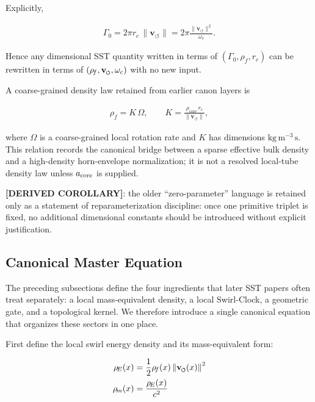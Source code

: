 \documentclass[11pt]{article}
\theoremstyle{definition}
\theoremstyle{plain}
\theoremstyle{remark}
\newcommand{\swirlarrow}{\mathchoice{\mkern-2mu\scriptstyle\boldsymbol{\circlearrowleft}}{\mkern-2mu\scriptstyle\boldsymbol{\circlearrowleft}}{\mkern-2mu\scriptscriptstyle\boldsymbol{\circlearrowleft}}{\mkern-2mu\scriptscriptstyle\boldsymbol{\circlearrowleft}}}
\newcommand{\vswirl}{\mathbf{v}_{\swirlarrow}}
\newcommand{\rhoF}{{\rho_{\!f}}}
\newcommand{\rhoE}{\rho_{\!E}}
\newcommand{\rhoM}{\rho_{\!m}}
\newcommand{\rhocore}{\rho_{\mathrm{core}}}
\newcommand{\rc}{{r_c}}
\newcommand{\vnorm}{\lVert \mathbf{v}_{\!\boldsymbol{\circlearrowleft}} \rVert}
\begin{document}
        Explicitly,

        \begin{align}
            \Gamma_0 = 2\pi \rc \, \vnorm
            = 2\pi \frac{\vnorm^2}{\omega_c}.
            \label{eq:gamma0_reparam}
        \end{align}

        Hence any dimensional SST quantity written in terms of $(\Gamma_0,\rhoF,\rc)$ can be rewritten in terms of $(\rhoF,\vswirl,\omega_c)$ with no new input.

        A coarse-grained density law retained from earlier canon layers is

        \begin{align}
            \rhoF = K\,\Omega,
            \qquad
            K = \frac{\rhocore \, \rc}{\vnorm},
            \label{eq:coarse_grain_density}
        \end{align}

        where $\Omega$ is a coarse-grained local rotation rate and $K$ has dimensions $\mathrm{kg\,m^{-3}\,s}$. This relation records the canonical bridge between a sparse effective bulk density and a high-density horn-envelope normalization; it is not a resolved local-tube density law unless $a_{\rm core}$ is supplied.

        \textbf{[DERIVED COROLLARY]}: the older ``zero-parameter'' language is retained only as a statement of reparameterization discipline: once one primitive triplet is fixed, no additional dimensional constants should be introduced without explicit justification.

    \subsection{Canonical Master Equation}
    \label{sec:master-equation}

        The preceding subsections define the four ingredients that later SST papers often treat separately:
        a local mass-equivalent density, a local Swirl-Clock, a geometric gate, and a topological kernel.
        We therefore introduce a single canonical equation that organizes these sectors in one place.

        First define the local swirl energy density and its mass-equivalent form:

        \begin{align}
            \rhoE(x) &= \frac{1}{2}\rhoF(x)\,\norm{\vswirl(x)}^2 \\
            \rhoM(x) &= \frac{\rhoE(x)}{c^2}
        \end{align}
\end{document}
